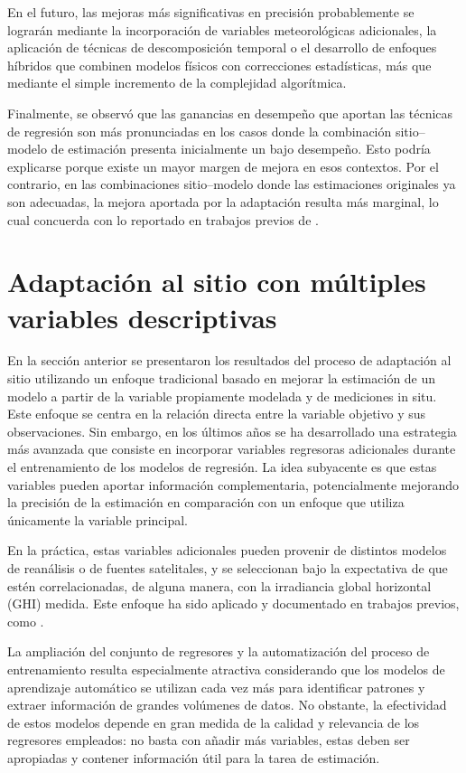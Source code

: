 En el futuro, las mejoras más significativas en precisión probablemente se lograrán mediante la incorporación de variables meteorológicas adicionales, la aplicación de técnicas de descomposición temporal o el desarrollo de enfoques híbridos que combinen modelos físicos con correcciones estadísticas, más que mediante el simple incremento de la complejidad algorítmica.

Finalmente, se observó que las ganancias en desempeño que aportan las técnicas de regresión son más pronunciadas en los casos donde la combinación sitio–modelo de estimación presenta inicialmente un bajo desempeño. Esto podría explicarse porque existe un mayor margen de mejora en esos contextos. Por el contrario, en las combinaciones sitio–modelo donde las estimaciones originales ya son adecuadas, la mejora aportada por la adaptación resulta más marginal, lo cual concuerda con lo reportado en trabajos previos de \citet{SALAMALIKIS2022, POLO2020}.


\section{Adaptación al sitio con múltiples variables descriptivas}\label{sec:02}

En la sección anterior se presentaron los resultados del proceso de adaptación al sitio utilizando un enfoque tradicional basado en mejorar la estimación de un modelo a partir de la variable propiamente modelada y de mediciones in situ. Este enfoque se centra en la relación directa entre la variable objetivo y sus observaciones. Sin embargo, en los últimos años se ha desarrollado una estrategia más avanzada que consiste en incorporar variables regresoras adicionales durante el entrenamiento de los modelos de regresión. La idea subyacente es que estas variables pueden aportar información complementaria, potencialmente mejorando la precisión de la estimación en comparación con un enfoque que utiliza únicamente la variable principal. 

En la práctica, estas variables adicionales pueden provenir de distintos modelos de reanálisis o de fuentes satelitales, y se seleccionan bajo la expectativa de que estén correlacionadas, de alguna manera, con la irradiancia global horizontal (GHI) medida. Este enfoque ha sido aplicado y documentado en trabajos previos, como \cite{Salazar2025, Miranda2021, Miranda2023}.

La ampliación del conjunto de regresores y la automatización del proceso de entrenamiento resulta especialmente atractiva considerando que los modelos de aprendizaje automático se utilizan cada vez más para identificar patrones y extraer información de grandes volúmenes de datos. No obstante, la efectividad de estos modelos depende en gran medida de la calidad y relevancia de los regresores empleados: no basta con añadir más variables, estas deben ser apropiadas y contener información útil para la tarea de estimación.

